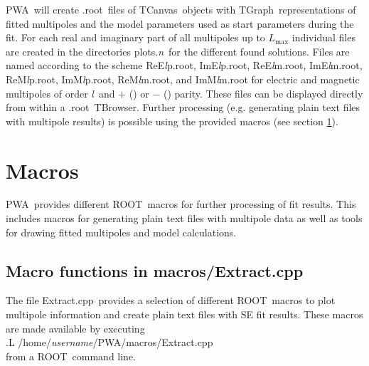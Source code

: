 \documentclass[a4paper,10pt]{article}
\def\PWA{\ttfamily PWA\rmfamily\ }
\def\tt{\ttfamily}
\def\rm{\rmfamily}
\begin{document}
\PWA will create \tt .root\rm\ files of \tt TCanvas\rm\ objects with \tt TGraph\rm\ representations of fitted multipoles
and the model parameters used as start parameters during the fit. For each real and imaginary part of all multipoles up to
$L_\mathrm{max}$ individual files are created in the directories \tt plots.\textit{n}\rm\ for the different found solutions.
Files are named according to the scheme 
\tt ReE\textit{l}p.root\rm, \tt ImE\textit{l}p.root\rm,
\tt ReE\textit{l}m.root\rm, \tt ImE\textit{l}m.root\rm,
\tt ReM\textit{l}p.root\rm, \tt ImM\textit{l}p.root\rm,
\tt ReM\textit{l}m.root\rm, and \tt ImM\textit{l}m.root\rm
for electric and magnetic multipoles of order \tt\textit{l}\rm\ and $+$ (\tt{p}\rm) or $-$ (\tt{m}\rm) parity.
These files can be displayed directly from within a \tt .root\rm\ \tt TBrowser\rm.
Further processing (e.g. generating plain text files with multipole results) is possible using the provided macros (see section
\ref{sec_macros}).

\section{Macros}\label{sec_macros}

\PWA provides different \tt ROOT\rm\ macros for further processing of fit results. This includes macros for generating plain text
files with multipole data as well as tools for drawing fitted multipoles and model calculations.

\subsection{Macro functions in  \tt macros/Extract.cpp\rm}

The file \tt Extract.cpp\rm\ provides a selection of different \tt ROOT\rm\ macros to plot multipole information
and create plain text files with SE fit results. These macros are made available by executing\\
\tt .L /home/\textit{username}/PWA/macros/Extract.cpp\rm\\
from a \tt ROOT\rm\ command line.
\end{document}

